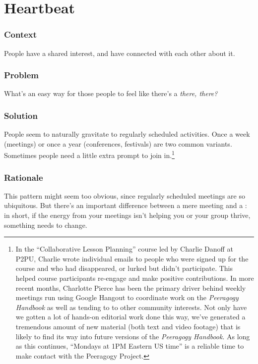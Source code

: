 \section{Heartbeat}\label{sec:Heartbeat}

\subsubsection*{Context}
People have a shared interest, and have connected with each other about it.

\subsubsection*{Problem} What's an easy way for those people to feel like there's a \emph{there, there?}

\subsubsection*{Solution} People seem to naturally gravitate to regularly scheduled
activities. Once a week (meetings) or once a year (conferences, festivals) are two common variants.  Sometimes people need a little extra prompt to join in.\footnote{In the ``Collaborative Lesson Planning'' course led
by Charlie Danoff at P2PU, Charlie wrote individual emails to people who
were signed up for the course and who had disappeared, or lurked but
didn't participate. This helped course participants
re-engage and make positive contributions. In more recent
months, Charlotte Pierce has been the primary driver behind weekly meetings run using Google
Hangout to coordinate work on the \emph{Peeragogy Handbook} as well as tending to to other community interests. Not only have we
gotten a lot of hands-on editorial work done this way, we've generated a
tremendous amount of new material (both text and video footage) that is
likely to find its way into future versions of the \emph{Peeragogy Handbook}.  As long as this continues, ``Mondays at 1PM Eastern US time'' is a reliable time to make contact with the Peeragogy Project.}

\subsubsection*{Rationale}  This pattern might seem too obvious, since regularly scheduled meetings are so ubiquitous.  But there's an important difference between a mere meeting and a : in short, if the energy from your meetings isn't helping you or your group thrive, something needs to change.

